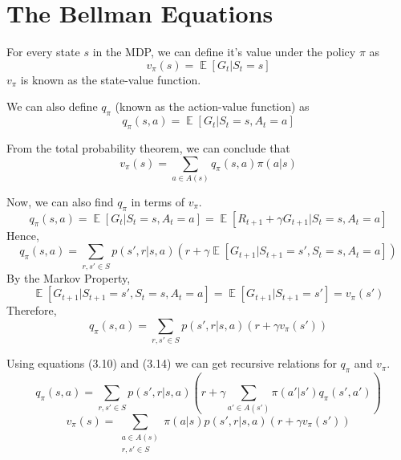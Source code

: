 \documentclass[12pt]{report}
\begin{document}
\section{The Bellman Equations}
For every state $s$ in the MDP, we can define it's value under the policy $\pi$ as 
\begin{equation}
    v_{\pi}(s) = \mathop{\mathbb{E}}\left[G_{t} | S_{t} = s\right]
\end{equation}
$v_{\pi}$ is known as the state-value function.

We can also define $q_{\pi}$ (known as the action-value function) as 
\begin{equation}
    q_{\pi}(s, a) = \mathop{\mathbb{E}}\left[G_{t} | S_{t} = s, A_{t} = a\right]
\end{equation}

From the total probability theorem, we can conclude that 
\begin{equation}
    v_{\pi}(s) = \sum\limits_{a \in A(s)} q_{\pi}(s, a)\pi(a | s)
\end{equation}

Now, we can also find $q_{\pi}$ in terms of $v_{\pi}$.
\begin{equation}
    q_{\pi}(s, a) = \mathop{\mathbb{E}}\left[G_{t} | S_{t} = s, A_{t} = a\right] = \mathop{\mathbb{E}}\left[R_{t + 1} + \gamma G_{t + 1} | S_{t} = s, A_{t} = a\right]
\end{equation} 
Hence,
\begin{equation}
    q_{\pi}(s, a) = \sum\limits_{r, s' \in S} p(s', r | s, a)(r + \gamma \mathop{\mathbb{E}}\left[G_{t + 1} | S_{t + 1} = s', S_{t} = s, A_{t} = a\right])
\end{equation}
By the Markov Property, 
\begin{equation}
    \mathop{\mathbb{E}}\left[G_{t + 1} | S_{t + 1} = s', S_{t} = s, A_{t} = a\right] = \mathop{\mathbb{E}}\left[G_{t + 1} | S_{t + 1} = s'\right] = v_{\pi}(s')
\end{equation}
Therefore,
\begin{equation}
    q_{\pi}(s, a) = \sum\limits_{r, s' \in S} p(s', r | s, a)(r + \gamma v_{\pi}(s'))
\end{equation}

Using equations (3.10) and (3.14) we can get recursive relations for $q_{\pi}$ and $v_{\pi}$.
\begin{equation}
    q_{\pi}(s, a) = \sum\limits_{r, s' \in S} p(s', r | s, a)(r + \gamma\sum\limits_{a' \in A(s')}\pi(a' | s') q_{\pi}(s', a'))
\end{equation}
\begin{equation}
    v_{\pi}(s) = \sum\limits_{\substack{a \in A(s)\\r, s' \in S}} \pi(a | s) p(s', r | s, a)(r + \gamma v_{\pi}(s'))
\end{equation}
\end{document}
